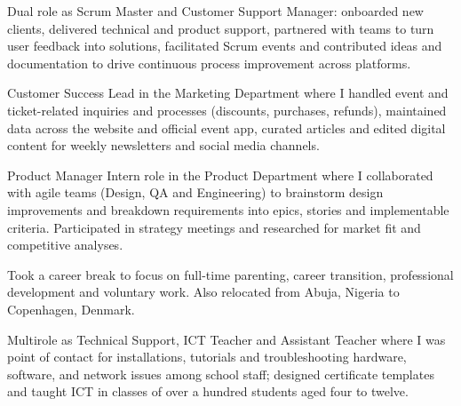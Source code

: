 \documentclass[
	a4paper,
]{fortysecondscv}
\begin{document}
	\makefrontsidebar

	\begin{cvtable}[2]


		{
			Dual role as Scrum Master and Customer Support Manager: onboarded new clients, delivered technical and product support, partnered with teams to turn user feedback into solutions, facilitated Scrum events and contributed ideas and documentation to drive continuous process improvement across platforms.
		}

		{
			Customer Success Lead in the Marketing Department where I handled event and ticket-related inquiries and processes (discounts, purchases, refunds), maintained data across the website and official event app, curated articles and edited digital content for weekly newsletters and social media channels.
		}

		{
			Product Manager Intern role in the Product Department where I collaborated with agile teams (Design, QA and Engineering) to brainstorm design improvements and breakdown requirements into epics, stories and implementable criteria. Participated in strategy meetings and researched for market fit and competitive analyses.
		}

		{
			Took a career break to focus on full-time parenting, career transition, professional development and voluntary work. Also relocated from Abuja, Nigeria to Copenhagen, Denmark.
		}

		{
			Multirole as Technical Support, ICT Teacher and Assistant Teacher where I was point of contact for installations, tutorials and troubleshooting hardware, software, and network issues among school staff; designed certificate templates and taught ICT in classes of over a hundred students aged four to twelve.
		}


\end{cvtable}
\end{document}
